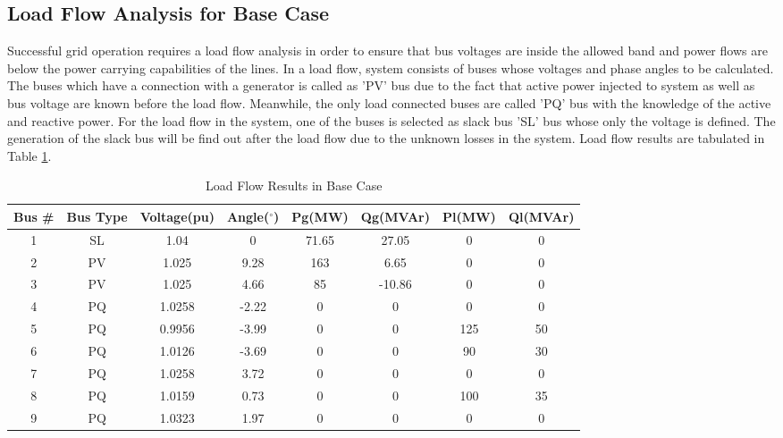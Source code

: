 \subsection{Load Flow Analysis for Base Case}
Successful grid operation requires a load flow analysis in order to ensure that bus voltages are inside the allowed band and power flows are below the power carrying capabilities of the lines. In a load flow, system consists of buses whose voltages and phase angles to be calculated. The buses which have a connection with a generator is called as 'PV' bus due to the fact that active power injected to system as well as bus voltage are known before the load flow. Meanwhile, the only load connected buses are called 'PQ' bus with the knowledge of the active and reactive power. For the load flow in the system, one of the buses is selected as slack bus 'SL' bus whose only the voltage is defined. The generation of the slack bus will be find out after the load flow due to the unknown losses in the system. Load flow results are tabulated in Table \ref{loadflow_case1}.
\begin{table}[h!]
	\centering
	\begin{tabular}{cclccccc}
		\hline
		Bus \# & Bus Type & \multicolumn{1}{c}{Voltage(pu)} & Angle($^{\circ}$) & Pg(MW)& Qg(MVAr)& Pl(MW)  & Ql(MVAr) \\ \hline
		1      & SL       & \multicolumn{1}{c}{1.04}    & 0     & 71.65 & 27.05  & 0   & 0  \\
		2      & PV       & \multicolumn{1}{c}{1.025}   & 9.28  & 163   & 6.65   & 0   & 0  \\
		3      & PV       & \multicolumn{1}{c}{1.025}   & 4.66  & 85    & -10.86 & 0   & 0  \\
		4      & PQ       & \multicolumn{1}{c}{1.0258}                      & -2.22 & 0     & 0      & 0   & 0  \\
		5      & PQ       & \multicolumn{1}{c}{0.9956}                      & -3.99 & 0     & 0      & 125 & 50 \\
		6      & PQ       & \multicolumn{1}{c}{1.0126}                      & -3.69 & 0     & 0      & 90  & 30 \\
		7      & PQ       & \multicolumn{1}{c}{1.0258}                      & 3.72  & 0     & 0      & 0   & 0  \\
		8      & PQ       & \multicolumn{1}{c}{1.0159}                      & 0.73  & 0     & 0      & 100 & 35 \\
		9      & PQ       & \multicolumn{1}{c}{1.0323}                      & 1.97  & 0     & 0      & 0   & 0  \\ \hline
	\end{tabular}
	\caption{Load Flow Results in Base Case}
	\label{loadflow_case1}
\end{table}
